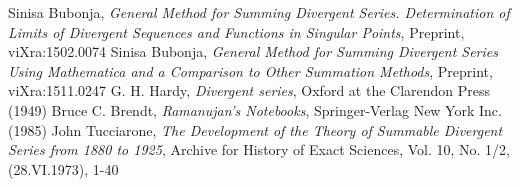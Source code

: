 \documentclass[12pt]{article}
\begin{document}
\begin{thebibliography}{9}


 Sinisa Bubonja, {\it General Method for Summing Divergent Series. Determination of Limits of Divergent Sequences and Functions in Singular Points}, Preprint, viXra:1502.0074
 Sinisa Bubonja, {\it General Method for Summing Divergent Series Using Mathematica and a Comparison to Other Summation Methods}, Preprint, viXra:1511.0247
 G. H. Hardy, {\it Divergent series}, Oxford at the Clarendon Press (1949) 
 Bruce C. Brendt, {\it Ramanujan's Notebooks}, Springer-Verlag New York Inc. (1985)
 John Tucciarone, {\it The Development of the Theory of Summable Divergent Series from 1880 to 1925}, Archive for History of Exact Sciences, Vol. 10, No. 1/2, (28.VI.1973), 1-40



\end{thebibliography}
\end{document}
